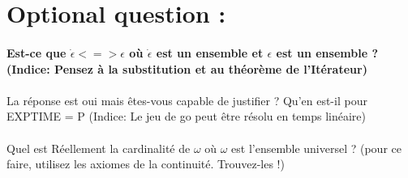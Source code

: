 \documentclass{article}
\begin{document}
    \section{Optional question :}
      \paragraph{Est-ce que $\dot{\epsilon} <=> \epsilon$ où $\dot{\epsilon}$ est un ensemble et $\epsilon$ est un ensemble ? (Indice: Pensez à la substitution et au théorème de l'Itérateur)}
      \paragraph{}
      La réponse est oui mais êtes-vous capable de justifier ? Qu'en est-il pour EXPTIME = P (Indice: Le jeu de go peut être résolu en temps linéaire)
      \paragraph{}
      Quel est Réellement la cardinalité de $\omega$ où $\omega$ est l'ensemble universel ? (pour ce faire, utilisez les axiomes de la continuité. Trouvez-les !)
\end{document}
